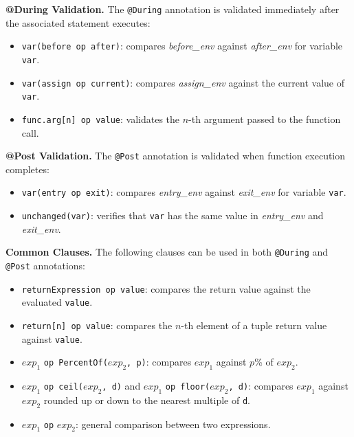 \documentclass[pdflatex,sn-basic]{sn-jnl}%
\theoremstyle{thmstyleone}%
\theoremstyle{thmstyletwo}%
\theoremstyle{thmstylethree}%
\begin{document}
\smallskip
\noindent\textbf{@During Validation.}
The \texttt{@During} annotation is validated immediately after the associated statement executes:
\begin{itemize}
    \item \texttt{var(before op after)}: compares \textit{before\_env} against \textit{after\_env} for variable \texttt{var}.

    \item \texttt{var(assign op current)}: compares \textit{assign\_env} against the current value of \texttt{var}.

    \item \texttt{func.arg[n] op value}: validates the $n$-th argument passed to the function call.
\end{itemize}

\smallskip
\noindent\textbf{@Post Validation.}
The \texttt{@Post} annotation is validated when function execution completes:
\begin{itemize}
    \item \texttt{var(entry op exit)}: compares \textit{entry\_env} against \textit{exit\_env} for variable \texttt{var}.

    \item \texttt{unchanged(var)}: verifies that \texttt{var} has the same value in \textit{entry\_env} and \textit{exit\_env}.
\end{itemize}

\smallskip
\noindent\textbf{Common Clauses.}
The following clauses can be used in both \texttt{@During} and \texttt{@Post} annotations:
\begin{itemize}
    \item \texttt{returnExpression op value}: compares the return value against the evaluated \texttt{value}.

    \item \texttt{return[n] op value}: compares the $n$-th element of a tuple return value against \texttt{value}.

    \item $\mathit{exp}_1$ \texttt{op PercentOf(}$\mathit{exp}_2$\texttt{, p)}: compares $\mathit{exp}_1$ against $p$\% of $\mathit{exp}_2$.

    \item $\mathit{exp}_1$ \texttt{op ceil(}$\mathit{exp}_2$\texttt{, d)} and $\mathit{exp}_1$ \texttt{op floor(}$\mathit{exp}_2$\texttt{, d)}: compares $\mathit{exp}_1$ against $\mathit{exp}_2$ rounded up or down to the nearest multiple of \texttt{d}.

    \item $\mathit{exp}_1$ \texttt{op} $\mathit{exp}_2$: general comparison between two expressions.
\end{itemize}
\end{document}
